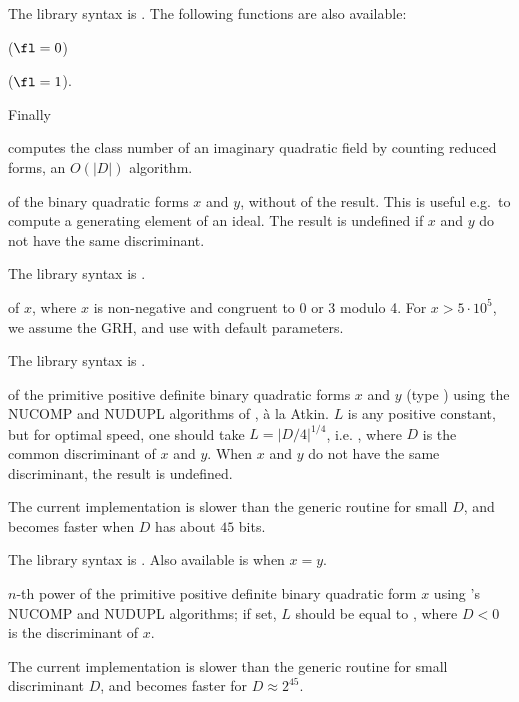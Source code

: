 The library syntax is .
The following functions are also available:

 ($\fl = 0$)

 ($\fl = 1$).

\noindent Finally

 computes the class number of an imaginary
quadratic field by counting reduced forms, an $O(|D|)$ algorithm.

\label{se:qfbcompraw}
 of the binary quadratic forms $x$ and $y$, without
 of the result. This is useful e.g.~to compute a generating
element of an ideal. The result is undefined if $x$ and $y$ do not have the
same discriminant.

The library syntax is .

\label{se:qfbhclassno}
 of $x$, where
$x$ is non-negative and congruent to 0 or 3 modulo 4. For $x > 5\cdot
10^5$, we assume the GRH, and use  with default
parameters.

The library syntax is .

\label{se:qfbnucomp}
 of the primitive positive
definite binary quadratic forms $x$ and $y$ (type ) using the NUCOMP
and NUDUPL algorithms of , \`a la Atkin. $L$ is any positive
constant, but for optimal speed, one should take $L=|D/4|^{1/4}$, i.e.
, where $D$ is the common discriminant of $x$ and
$y$. When $x$ and $y$ do not have the same discriminant, the result is
undefined.

The current implementation is slower than the generic routine for small $D$,
and becomes faster when $D$ has about $45$ bits.

The library syntax is .
Also available is  when $x=y$.

\label{se:qfbnupow}
$n$-th power of the primitive positive definite
binary quadratic form $x$ using 's NUCOMP and NUDUPL algorithms;
if set, $L$ should be equal to , where $D < 0$ is
the discriminant of $x$.

The current implementation is slower than the generic routine for small
discriminant $D$, and becomes faster for $D \approx 2^45$.

